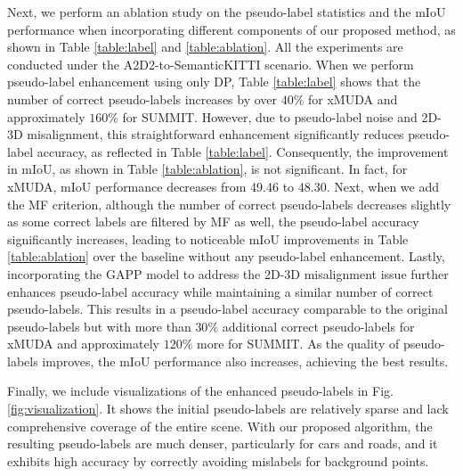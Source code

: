 Next, we perform an ablation study on the pseudo-label statistics and the mIoU performance when incorporating different components of our proposed method, as shown in Table \ref{table:label} and \ref{table:ablation}. All the experiments are conducted under the A2D2-to-SemanticKITTI scenario. When we perform pseudo-label enhancement using only DP, Table \ref{table:label} shows that the number of correct pseudo-labels increases by over $40\%$ for xMUDA and approximately $160\%$ for SUMMIT. However, due to pseudo-label noise and 2D-3D misalignment, this straightforward enhancement significantly reduces pseudo-label accuracy, as reflected in Table \ref{table:label}. Consequently, the improvement in mIoU, as shown in Table \ref{table:ablation}, is not significant. In fact, for xMUDA, mIoU performance decreases from 49.46 to 48.30. Next, when we add the MF criterion, although the number of correct pseudo-labels decreases slightly as some correct labels are filtered by MF as well, the pseudo-label accuracy significantly increases, leading to noticeable mIoU improvements in Table \ref{table:ablation} over the baseline without any pseudo-label enhancement. Lastly, incorporating the GAPP model to address the 2D-3D misalignment issue further enhances pseudo-label accuracy while maintaining a similar number of correct pseudo-labels.  This results in a pseudo-label accuracy comparable to the original pseudo-labels but with more than $30\%$ additional correct pseudo-labels for xMUDA and approximately $120\%$ more for SUMMIT. As the quality of pseudo-labels improves, the mIoU performance also increases, achieving the best results.

Finally, we include visualizations of the enhanced pseudo-labels in Fig. \ref{fig:visualization}. It shows the initial pseudo-labels are relatively sparse and lack comprehensive coverage of the entire scene. With our proposed algorithm, the resulting pseudo-labels are much denser, particularly for cars and roads, and it exhibits high accuracy by correctly avoiding mislabels for background points.






